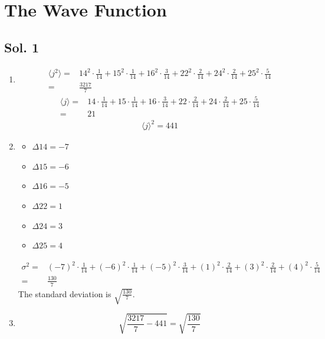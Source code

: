 \section{The Wave Function}

\subsection*{Sol. 1}
\begin{enumerate}
    \item \begin{align*}
        \langle j^2\rangle 
    =& 14^2\cdot \frac{1}{14} + 15 ^ 2\cdot\frac{1}{14} 
    + 16^2\cdot \frac{3}{14} + 22 ^ 2\cdot\frac{2}{14} 
    + 24^2\cdot \frac{2}{14} + 25 ^ 2\cdot\frac{5}{14} \\
    = & \frac{3217}{7}    
    \end{align*}
    \begin{align*}
        \langle j\rangle
    =& 14\cdot \frac{1}{14} + 15 \cdot\frac{1}{14} 
    + 16 \cdot \frac{3}{14} + 22 \cdot\frac{2}{14} 
    + 24 \cdot \frac{2}{14} + 25 \cdot\frac{5}{14} \\
    = & 21
    \end{align*}
    \begin{align*}
        \langle j\rangle^2 = 441
    \end{align*}
    \item 
    \begin{itemize}
        \item $\Delta 14=-7$
        \item $\Delta 15=-6$
        \item $\Delta 16=-5$
        \item $\Delta 22=1$
        \item $\Delta 24=3$
        \item $\Delta 25=4$
    \end{itemize}
    \begin{align*}
        \sigma^2 = & 
        (-7)^2 \cdot \frac{1}{14} + (-6)^2 \cdot\frac{1}{14} 
    + (-5)^2 \cdot \frac{3}{14} + (1)^2 \cdot\frac{2}{14} 
    + (3)^2 \cdot \frac{2}{14} + (4)^2 \cdot\frac{5}{14} \\
    = & \frac{130}{7}
    \end{align*}
    The standard deviation is $\sqrt{\frac{130}{7}}$.
    \item $$
    \sqrt{\frac{3217}{7}-441} = \sqrt{\frac{130}{7}}
    $$
\end{enumerate}

